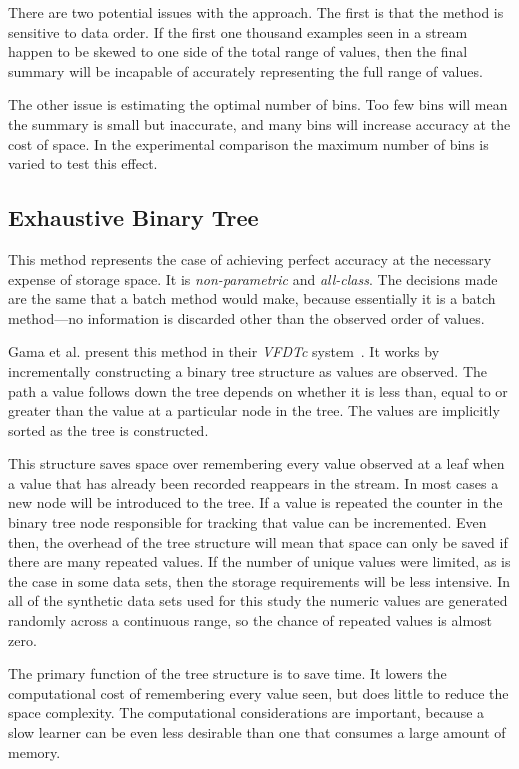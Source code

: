 There are two potential issues with the approach. The first is that the method is sensitive to data order. If the first one thousand examples seen in a stream happen to be skewed to one side of the total range of values, then the final summary will be incapable of accurately representing the full range of values.

The other issue is estimating the optimal number of bins. Too few bins will mean the summary is small but inaccurate, and many bins will increase accuracy at the cost of space. In the experimental comparison the maximum number of bins is varied to test this effect.

\subsection{Exhaustive Binary Tree}
\label{sec:bintreenum}

This method represents the case of achieving perfect accuracy at the necessary expense of storage space. It is {\em non-parametric} and {\em all-class}. The decisions made are the same that a batch method would make, because essentially it is a batch method---no information is discarded other than the observed order of values.

Gama et al. present this method in their {\em VFDTc} system~\cite{vfdtc}. It works by incrementally constructing a binary tree structure as values are observed. The path a value follows down the tree depends on whether it is less than, equal to or greater than the value at a particular node in the tree. The values are implicitly sorted as the tree is constructed.

This structure saves space over remembering every value observed at a
leaf when a value that
has already been recorded reappears in the stream. In most cases a new node will be introduced to the tree. If a value is repeated the counter in the binary tree node responsible for tracking that value can be incremented.  Even then, the overhead of the tree structure will mean that space can only be saved if there are many repeated values. If the number of unique values were limited, as is the case in some data sets, then the storage requirements will be less intensive. In all of the synthetic data sets used for this study the numeric values are generated randomly across a continuous range, so the chance of repeated values is almost zero.

The primary function of the tree structure is to save time. It lowers the computational cost of remembering every value seen, but does little to reduce the space complexity. The computational considerations are important, because a slow learner can be even less desirable than one that consumes a large amount of memory. %

